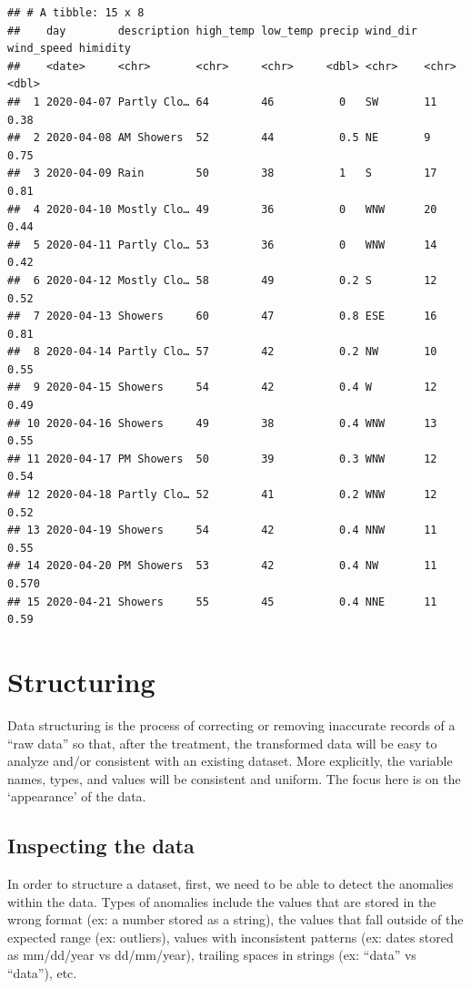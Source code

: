 \documentclass[
]{book}
\begin{document}
\begin{verbatim}
## # A tibble: 15 x 8
##    day        description high_temp low_temp precip wind_dir wind_speed himidity
##    <date>     <chr>       <chr>     <chr>     <dbl> <chr>    <chr>         <dbl>
##  1 2020-04-07 Partly Clo… 64        46          0   SW       11            0.38 
##  2 2020-04-08 AM Showers  52        44          0.5 NE       9             0.75 
##  3 2020-04-09 Rain        50        38          1   S        17            0.81 
##  4 2020-04-10 Mostly Clo… 49        36          0   WNW      20            0.44 
##  5 2020-04-11 Partly Clo… 53        36          0   WNW      14            0.42 
##  6 2020-04-12 Mostly Clo… 58        49          0.2 S        12            0.52 
##  7 2020-04-13 Showers     60        47          0.8 ESE      16            0.81 
##  8 2020-04-14 Partly Clo… 57        42          0.2 NW       10            0.55 
##  9 2020-04-15 Showers     54        42          0.4 W        12            0.49 
## 10 2020-04-16 Showers     49        38          0.4 WNW      13            0.55 
## 11 2020-04-17 PM Showers  50        39          0.3 WNW      12            0.54 
## 12 2020-04-18 Partly Clo… 52        41          0.2 WNW      12            0.52 
## 13 2020-04-19 Showers     54        42          0.4 NNW      11            0.55 
## 14 2020-04-20 PM Showers  53        42          0.4 NW       11            0.570
## 15 2020-04-21 Showers     55        45          0.4 NNE      11            0.59
\end{verbatim}

\hypertarget{structuring}{%
\chapter{Structuring}\label{structuring}}

Data structuring is the process of correcting or removing inaccurate records of a ``raw data'' so that, after the treatment, the transformed data will be easy to analyze and/or consistent with an existing dataset. More explicitly, the variable names, types, and values will be consistent and uniform. The focus here is on the `appearance' of the data.

\hypertarget{inspecting-the-data}{%
\section{Inspecting the data}\label{inspecting-the-data}}

In order to structure a dataset, first, we need to be able to detect the anomalies within the data. Types of anomalies include the values that are stored in the wrong format (ex: a number stored as a string), the values that fall outside of the expected range (ex: outliers), values with inconsistent patterns (ex: dates stored as mm/dd/year vs dd/mm/year), trailing spaces in strings (ex: ``data'' vs ``data''), etc.
\end{document}
